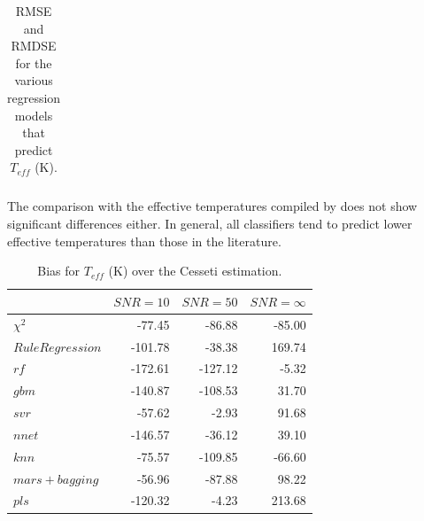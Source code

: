 \begin{table}
\begin{tabular}{@{}rrrcrrcrr@{}}
\bottomrule
\end{tabular}
\caption {RMSE and RMDSE for the various regression models that predict $T_{eff}$ (K).} 
\label{tab:model_TSD} 
\end{table}


The comparison with the effective temperatures compiled
by \cite{cesetti} does not show significant differences either. In
general, all classifiers tend to predict lower effective temperatures
than those in the literature.

\begin{table}\centering
{}
\begin{tabular}{@{}lrrr@{}}\toprule
& {$SNR = 10$} & {$SNR = 50$} & {$SNR = \infty$}\\ \midrule
$\chi^2 $    &  -77.45 & -86.88 & -85.00 \\
$Rule Regression$ & -101.78 & -38.38 & 169.74 \\
$rf $ & -172.61 & -127.12 & -5.32 \\
$gbm $ & -140.87 & -108.53 & 31.70 \\
$svr $ & -57.62 & -2.93 & 91.68 \\
$nnet$ & -146.57 & -36.12 & 39.10 \\
$knn $ & -75.57 & -109.85 & -66.60 \\
$mars + bagging $& -56.96 & -87.88 & 98.22 \\
$pls $ & -120.32 & -4.23 & 213.68 \\

\bottomrule
\end{tabular}
\caption {Bias for $T_{eff}$ (K) over the Cesseti estimation.} 
\label{tab:model_Tbias} 
\end{table}


